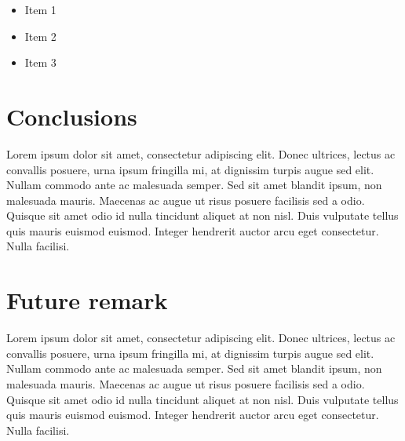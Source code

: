\documentclass[12pt]{article}
\begin{document}
\begin{itemize}
\item Item 1
\item Item 2
\item Item 3
\end{itemize}

\section{Conclusions}
Lorem ipsum dolor sit amet, consectetur adipiscing elit. Donec ultrices, lectus ac convallis posuere, urna ipsum fringilla mi, at dignissim turpis augue sed elit. Nullam commodo ante ac malesuada semper. Sed sit amet blandit ipsum, non malesuada mauris. Maecenas ac augue ut risus posuere facilisis sed a odio. Quisque sit amet odio id nulla tincidunt aliquet at non nisl. Duis vulputate tellus quis mauris euismod euismod. Integer hendrerit auctor arcu eget consectetur. Nulla facilisi.

\section{Future remark}
Lorem ipsum dolor sit amet, consectetur adipiscing elit. Donec ultrices, lectus ac convallis posuere, urna ipsum fringilla mi, at dignissim turpis augue sed elit. Nullam commodo ante ac malesuada semper. Sed sit amet blandit ipsum, non malesuada mauris. Maecenas ac augue ut risus posuere facilisis sed a odio. Quisque sit amet odio id nulla tincidunt aliquet at non nisl. Duis vulputate tellus quis mauris euismod euismod. Integer hendrerit auctor arcu eget consectetur. Nulla facilisi.



\end{document}
